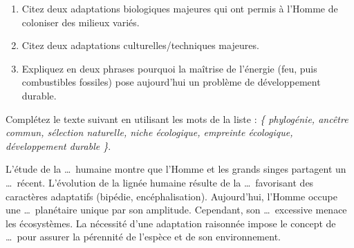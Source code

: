 \documentclass[11pt]{article}
\begin{document}
\begin{exercice}
\begin{enumerate}
    \item Citez deux adaptations biologiques majeures qui ont permis à l'Homme de coloniser des milieux variés.
    \item Citez deux adaptations culturelles/techniques majeures.
    \item Expliquez en deux phrases pourquoi la maîtrise de l'énergie (feu, puis combustibles fossiles) pose aujourd'hui un problème de développement durable.
\end{enumerate}
\end{exercice}

\begin{exercice}
Complétez le texte suivant en utilisant les mots de la liste : 
\textit{\{ phylogénie, ancêtre commun, sélection naturelle, niche écologique, empreinte écologique, développement durable \}}.

L'étude de la \dots\ humaine montre que l'Homme et les grands singes partagent un \dots\ récent. L'évolution de la lignée humaine résulte de la \dots\ favorisant des caractères adaptatifs (bipédie, encéphalisation). Aujourd'hui, l'Homme occupe une \dots\ planétaire unique par son amplitude. Cependant, son \dots\ excessive menace les écosystèmes. La nécessité d'une adaptation raisonnée impose le concept de \dots\ pour assurer la pérennité de l'espèce et de son environnement.
\end{exercice}
\end{document}

